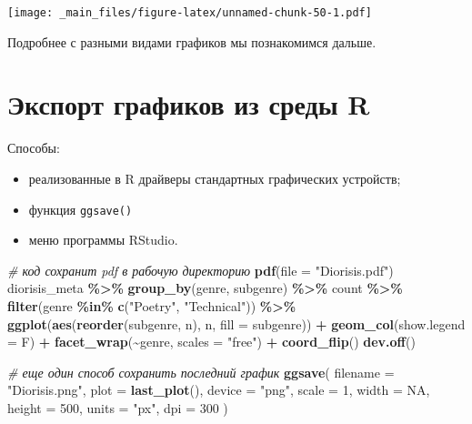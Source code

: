 \documentclass[
]{book}
\newenvironment{Shaded}{\begin{snugshade}}{\end{snugshade}}
\newcommand{\AttributeTok}[1]{\textcolor[rgb]{0.13,0.29,0.53}{#1}}
\newcommand{\CommentTok}[1]{\textcolor[rgb]{0.56,0.35,0.01}{\textit{#1}}}
\newcommand{\ConstantTok}[1]{\textcolor[rgb]{0.56,0.35,0.01}{#1}}
\newcommand{\DecValTok}[1]{\textcolor[rgb]{0.00,0.00,0.81}{#1}}
\newcommand{\FunctionTok}[1]{\textcolor[rgb]{0.13,0.29,0.53}{\textbf{#1}}}
\newcommand{\NormalTok}[1]{#1}
\newcommand{\SpecialCharTok}[1]{\textcolor[rgb]{0.81,0.36,0.00}{\textbf{#1}}}
\newcommand{\StringTok}[1]{\textcolor[rgb]{0.31,0.60,0.02}{#1}}
\providecommand{\tightlist}{%
  \setlength{\itemsep}{0pt}\setlength{\parskip}{0pt}}
\theoremstyle{definition}
\theoremstyle{definition}
\theoremstyle{definition}
\theoremstyle{definition}
\theoremstyle{remark}
\begin{document}
\texttt{[image: \_main\_files/figure-latex/unnamed-chunk-50-1.pdf]}

Подробнее с разными видами графиков мы познакомимся дальше.

\hypertarget{ux44dux43aux441ux43fux43eux440ux442-ux433ux440ux430ux444ux438ux43aux43eux432-ux438ux437-ux441ux440ux435ux434ux44b-r}{%
\section{Экспорт графиков из среды R}\label{ux44dux43aux441ux43fux43eux440ux442-ux433ux440ux430ux444ux438ux43aux43eux432-ux438ux437-ux441ux440ux435ux434ux44b-r}}

Способы:

\begin{itemize}
\tightlist
\item
  реализованные в R драйверы стандартных графических устройств;
\item
  функция \texttt{ggsave()}
\item
  меню программы RStudio.
\end{itemize}

\begin{Shaded}
\begin{Highlighting}[]
\CommentTok{\# код сохранит pdf в рабочую директорию }
\FunctionTok{pdf}\NormalTok{(}\AttributeTok{file =} \StringTok{"Diorisis.pdf"}\NormalTok{)}
\NormalTok{diorisis\_meta }\SpecialCharTok{\%\textgreater{}\%} 
  \FunctionTok{group\_by}\NormalTok{(genre, subgenre) }\SpecialCharTok{\%\textgreater{}\%} 
\NormalTok{  count }\SpecialCharTok{\%\textgreater{}\%}
  \FunctionTok{filter}\NormalTok{(genre }\SpecialCharTok{\%in\%} \FunctionTok{c}\NormalTok{(}\StringTok{"Poetry"}\NormalTok{, }\StringTok{"Technical"}\NormalTok{)) }\SpecialCharTok{\%\textgreater{}\%} 
  \FunctionTok{ggplot}\NormalTok{(}\FunctionTok{aes}\NormalTok{(}\FunctionTok{reorder}\NormalTok{(subgenre, n), n, }\AttributeTok{fill =}\NormalTok{ subgenre)) }\SpecialCharTok{+} 
  \FunctionTok{geom\_col}\NormalTok{(}\AttributeTok{show.legend =}\NormalTok{ F) }\SpecialCharTok{+}
  \FunctionTok{facet\_wrap}\NormalTok{(}\SpecialCharTok{\textasciitilde{}}\NormalTok{genre, }\AttributeTok{scales =} \StringTok{"free"}\NormalTok{) }\SpecialCharTok{+}
  \FunctionTok{coord\_flip}\NormalTok{()}
\FunctionTok{dev.off}\NormalTok{()}

\CommentTok{\# еще один способ сохранить последний график}
\FunctionTok{ggsave}\NormalTok{(}
  \AttributeTok{filename =} \StringTok{"Diorisis.png"}\NormalTok{,}
  \AttributeTok{plot =} \FunctionTok{last\_plot}\NormalTok{(),}
  \AttributeTok{device =} \StringTok{"png"}\NormalTok{,}
  \AttributeTok{scale =} \DecValTok{1}\NormalTok{,}
  \AttributeTok{width =} \ConstantTok{NA}\NormalTok{,}
  \AttributeTok{height =} \DecValTok{500}\NormalTok{,}
  \AttributeTok{units =} \StringTok{"px"}\NormalTok{,}
  \AttributeTok{dpi =} \DecValTok{300}
\NormalTok{)}
\end{Highlighting}
\end{Shaded}
\end{document}
